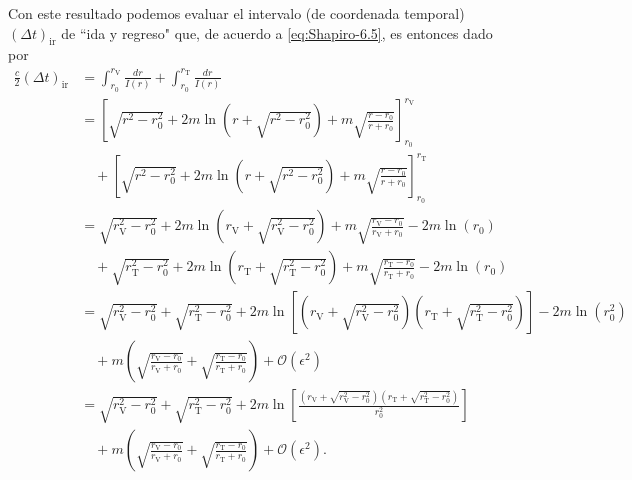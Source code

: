 \documentclass[letterpaper,11pt]{article}
\begin{document}
Con este resultado podemos evaluar el intervalo (de coordenada temporal) $(\Delta t)_{\text{ir}}$ de ``ida y regreso" que, de acuerdo a \eqref{eq:Shapiro-6.5}, es entonces dado por
\begin{align}
\frac{c}{2} (\Delta t)_{\text{ir}} &= \int_{r_0}^{r_{\text{V}}} \frac{dr}{I(r)} + \int_{r_0}^{r_{\text{T}}} \frac{dr}{I(r)} \nonumber \\
&= \left[\sqrt{r^2 - r_0^2} + 2m \ln\left(r+ \sqrt{r^2-r_0^2}\right) + m \sqrt{\frac{r-r_0}{r+r_0}} \right]_{r_0}^{r_{\text{V}}} \nonumber\\
& \quad + \left[\sqrt{r^2 - r_0^2} + 2m \ln\left(r+ \sqrt{r^2-r_0^2}\right) + m \sqrt{\frac{r-r_0}{r+r_0}} \right]_{r_0}^{r_{\text{T}}} \nonumber\\
&= \sqrt{r_{\text{V}}^2 - r_0^2} + 2m\ln\left(r_{\text{V}} + \sqrt{r_{\text{V}}^2 - r_0^2}\right) + m \sqrt{\frac{r_{\text{V}} - r_0}{r_{\text{V}} + r_0}} - 2m \ln(r_0) \nonumber\\
&\quad + \sqrt{r_{\text{T}}^2 - r_0^2} + 2m \ln\left(r_{\text{T}} + \sqrt{r_{\text{T}}^2 - r_0^2}\right) +  m \sqrt{\frac{r_{\text{T}} - r_0}{r_{\text{T}} + r_0}} - 2m \ln(r_0)\nonumber\\
&= \sqrt{r_{\text{V}}^2 - r_0^2} + \sqrt{r_{\text{T}}^2 - r_0^2} + 2m \ln\left[\left(r_{\text{V}} + \sqrt{r_{\text{V}}^2 - r_0^2}\right)\left(r_{\text{T}} + \sqrt{r_{\text{T}}^2 - r_0^2}\right)\right] - 2m \ln(r_0^2) \nonumber\\
&\quad + m \left(\sqrt{\frac{r_{\text{V}} - r_0}{r_{\text{V}} + r_0}} + \sqrt{\frac{r_{\text{T}} - r_0}{r_{\text{T}} + r_0}}\right) + \mathcal{O}(\epsilon^2) \nonumber\\
&= \sqrt{r_{\text{V}}^2 - r_0^2} + \sqrt{r_{\text{T}}^2 - r_0^2} + 2m \ln\left[\frac{\left(r_{\text{V}} + \sqrt{r_{\text{V}}^2 - r_0^2}\right)\left(r_{\text{T}} + \sqrt{r_{\text{T}}^2 - r_0^2}\right)}{r_0^2} \right] \nonumber\\
&\quad  + m \left(\sqrt{\frac{r_{\text{V}} - r_0}{r_{\text{V}} + r_0}} + \sqrt{\frac{r_{\text{T}} - r_0}{r_{\text{T}} + r_0}}\right) + \mathcal{O}(\epsilon^2).
\end{align}
\end{document}
